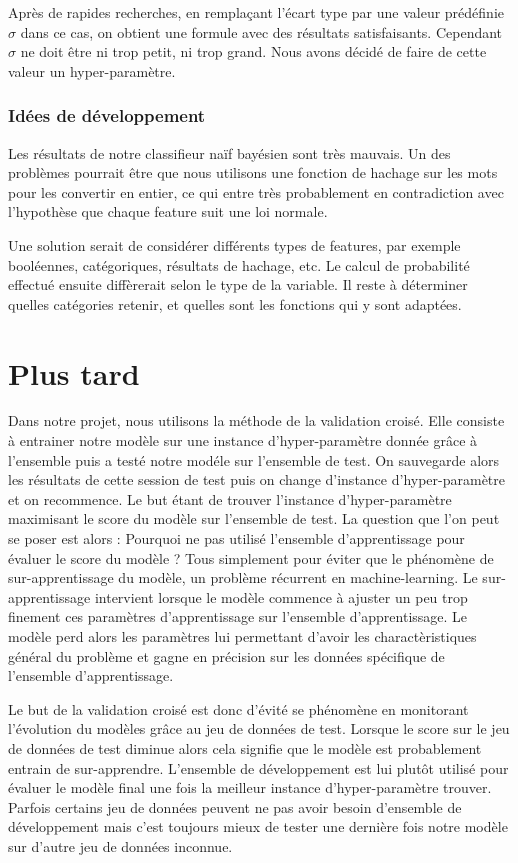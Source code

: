 \documentclass[french, 14pt]{memoir}
\begin{document}
Après de rapides recherches, en remplaçant l'écart type par une valeur prédéfinie $\sigma$ dans ce cas, on obtient une formule avec des résultats satisfaisants. Cependant $\sigma$ ne doit être ni trop petit, ni trop grand. Nous avons décidé de faire de cette valeur un hyper-paramètre.


\subsection{Idées de développement}

Les résultats de notre classifieur naïf bayésien sont très mauvais. Un des problèmes pourrait être que nous utilisons une fonction de hachage sur les mots pour les convertir en entier, ce qui entre très probablement en contradiction avec l'hypothèse que chaque feature suit une loi normale.

Une solution serait de considérer différents types de features, par exemple booléennes, catégoriques, résultats de hachage, etc. Le calcul de probabilité effectué ensuite diffèrerait selon le type de la variable. Il reste à déterminer quelles catégories retenir, et quelles sont les fonctions qui y sont adaptées.


\chapter*{Plus tard}

Dans notre projet, nous utilisons la méthode de la validation croisé. Elle consiste à entrainer notre modèle sur une instance d'hyper-paramètre donnée grâce à l'ensemble puis a testé notre modéle sur l'ensemble de test. On sauvegarde alors les résultats de cette session de test puis on change d'instance d'hyper-paramètre et on recommence. Le but étant de trouver l'instance d'hyper-paramètre maximisant le score du modèle sur l'ensemble de test.
La question que l'on peut se poser est alors : Pourquoi ne pas utilisé l'ensemble d'apprentissage pour évaluer le score du modèle ? 
Tous simplement pour éviter que le phénomène de sur-apprentissage du modèle, un problème récurrent en machine-learning. Le sur-apprentissage intervient lorsque le modèle commence à ajuster un peu trop finement ces paramètres d'apprentissage sur l'ensemble d'apprentissage. Le modèle perd alors les paramètres lui permettant d'avoir les charactèristiques général du problème et gagne en précision sur les données spécifique de l'ensemble d'apprentissage.

Le but de la validation croisé est donc d'évité se phénomène en monitorant l'évolution du modèles grâce au jeu de données de test. Lorsque le score sur le jeu de données de test diminue alors cela signifie que le modèle est probablement entrain de sur-apprendre. 
L'ensemble de développement est lui plutôt utilisé pour évaluer le modèle final une fois la meilleur instance d'hyper-paramètre trouver. Parfois certains jeu de données peuvent ne pas avoir besoin d'ensemble de développement mais c'est toujours mieux de tester une dernière fois notre modèle sur d'autre jeu de données inconnue. 
\end{document}
